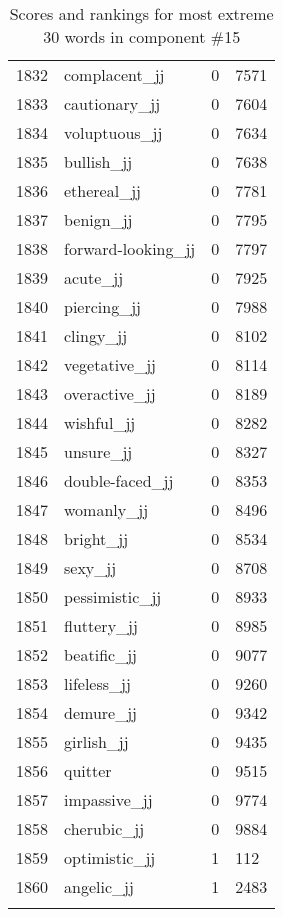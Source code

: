 \begin{longtable}[!htbp]{| rlr@{.}l |}
    1832 & complacent\_jj & 0 & 7571 \\
    1833 & cautionary\_jj & 0 & 7604 \\
    1834 & voluptuous\_jj & 0 & 7634 \\
    1835 & bullish\_jj & 0 & 7638 \\
    1836 & ethereal\_jj & 0 & 7781 \\
    1837 & benign\_jj & 0 & 7795 \\
    1838 & forward-looking\_jj & 0 & 7797 \\
    1839 & acute\_jj & 0 & 7925 \\
    1840 & piercing\_jj & 0 & 7988 \\
    1841 & clingy\_jj & 0 & 8102 \\
    1842 & vegetative\_jj & 0 & 8114 \\
    1843 & overactive\_jj & 0 & 8189 \\
    1844 & wishful\_jj & 0 & 8282 \\
    1845 & unsure\_jj & 0 & 8327 \\
    1846 & double-faced\_jj & 0 & 8353 \\
    1847 & womanly\_jj & 0 & 8496 \\
    1848 & bright\_jj & 0 & 8534 \\
    1849 & sexy\_jj & 0 & 8708 \\
    1850 & pessimistic\_jj & 0 & 8933 \\
    1851 & fluttery\_jj & 0 & 8985 \\
    1852 & beatific\_jj & 0 & 9077 \\
    1853 & lifeless\_jj & 0 & 9260 \\
    1854 & demure\_jj & 0 & 9342 \\
    1855 & girlish\_jj & 0 & 9435 \\
    1856 & quitter & 0 & 9515 \\
    1857 & impassive\_jj & 0 & 9774 \\
    1858 & cherubic\_jj & 0 & 9884 \\
    1859 & optimistic\_jj & 1 & 112 \\
    1860 & angelic\_jj & 1 & 2483 \\
    \hline
    \caption{Scores and rankings for most extreme 30 words in component \#15} \\
\end{longtable}
